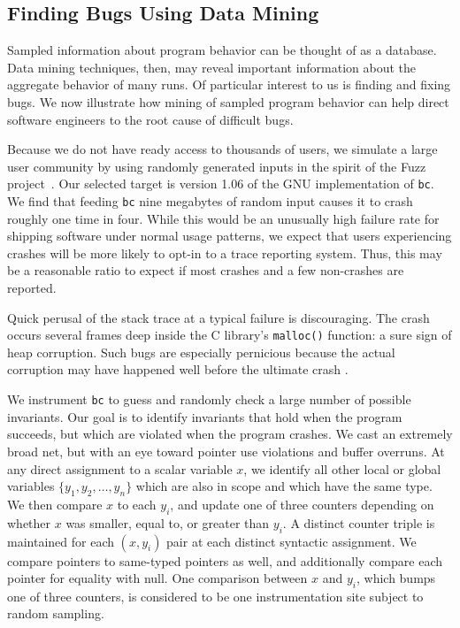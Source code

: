 
\subsection{Finding Bugs Using Data Mining}
\label{sec:applications:mining}

Sampled information about program behavior can be thought of as a
database.  Data mining techniques, then, may reveal important
information about the aggregate behavior of many runs.  Of particular
interest to us is finding and fixing bugs.  We now illustrate how
mining of sampled program behavior can help direct software engineers
to the root cause of difficult bugs.

Because we do not have ready access to thousands of users, we simulate
a large user community by using randomly generated inputs in the
spirit of the Fuzz project~\cite{MKLMMNS95}.  Our selected target is
version 1.06 of the GNU implementation of \texttt{bc}.  We find that
feeding \texttt{bc} nine megabytes of random input causes it to crash
roughly one time in four.  While this would be an unusually high
failure rate for shipping software under normal usage patterns, we
expect that users experiencing crashes will be more likely to opt-in
to a trace reporting system.  Thus, this may be a reasonable ratio to
expect if most crashes and a few non-crashes are reported.

Quick perusal of the stack trace at a typical failure is discouraging.
The crash occurs several frames deep inside the C library's
\texttt{malloc()} function: a sure sign of heap corruption.  Such bugs
are especially pernicious because the actual corruption may have
happened well before the ultimate crash \cite{Eisenstadt1993b}.

We instrument \texttt{bc} to guess and randomly check a large number
of possible invariants.  Our goal is to identify invariants that hold
when the program succeeds, but which are violated when the program
crashes.  We cast an extremely broad net, but with an eye toward
pointer use violations and buffer overruns.  At any direct assignment
to a scalar variable $x$, we identify all other local or global
variables $\{ y_1, y_2, \dots, y_n \}$ which are also in scope and
which have the same type.  We then compare $x$ to each $y_i$, and
update one of three counters depending on whether $x$ was smaller,
equal to, or greater than $y_i$.  A distinct counter triple is
maintained for each $(x, y_i)$ pair at each distinct syntactic
assignment.  We compare pointers to same-typed pointers as well, and
additionally compare each pointer for equality with null.  One
comparison between $x$ and $y_i$, which bumps one of three counters,
is considered to be one instrumentation site subject to random
sampling.

